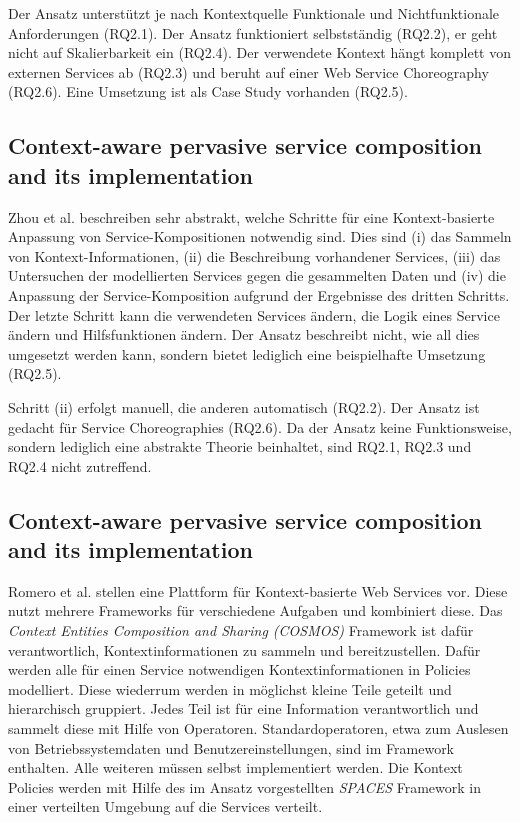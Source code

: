 \documentclass[conference,compsoc]{IEEEtran}
\begin{document}
Der Ansatz unterstützt je nach Kontextquelle Funktionale und Nichtfunktionale Anforderungen (RQ2.1). Der Ansatz funktioniert selbstständig (RQ2.2), er geht nicht auf Skalierbarkeit ein (RQ2.4). Der verwendete Kontext hängt komplett von externen Services ab (RQ2.3) und beruht auf einer Web Service Choreography (RQ2.6). Eine Umsetzung ist als Case Study vorhanden (RQ2.5).

\subsection{Context-aware pervasive service composition and its implementation}
Zhou et al. \cite{ZGP11} beschreiben sehr abstrakt, welche Schritte für eine Kontext-basierte Anpassung von Service-Kompositionen notwendig sind. Dies sind (i) das Sammeln von Kontext-Informationen, (ii) die Beschreibung vorhandener Services, (iii) das Untersuchen der modellierten Services gegen die gesammelten Daten und (iv) die Anpassung der Service-Komposition aufgrund der Ergebnisse des dritten Schritts. Der letzte Schritt kann die verwendeten Services ändern, die Logik eines Service ändern und Hilfsfunktionen ändern. Der Ansatz beschreibt nicht, wie all dies umgesetzt werden kann, sondern bietet lediglich eine beispielhafte Umsetzung (RQ2.5).

Schritt (ii) erfolgt manuell, die anderen automatisch (RQ2.2). Der Ansatz ist gedacht für Service Choreographies (RQ2.6). Da der Ansatz keine Funktionsweise, sondern lediglich eine abstrakte Theorie beinhaltet, sind RQ2.1, RQ2.3 und RQ2.4 nicht zutreffend.

\subsection{Context-aware pervasive service composition and its implementation}
Romero et al. \cite{RRS10} stellen eine Plattform für Kontext-basierte Web Services vor. Diese nutzt mehrere Frameworks für verschiedene Aufgaben und kombiniert diese. Das \textit{Context Entities Composition and Sharing (COSMOS)} Framework \cite{RCS08} ist dafür verantwortlich, Kontextinformationen zu sammeln und bereitzustellen. Dafür werden alle für einen Service notwendigen Kontextinformationen in Policies modelliert. Diese wiederrum werden in möglichst kleine Teile geteilt und hierarchisch gruppiert. Jedes Teil ist für eine Information verantwortlich und sammelt diese mit Hilfe von Operatoren. Standardoperatoren, etwa zum Auslesen von Betriebssystemdaten und Benutzereinstellungen, sind im Framework enthalten. Alle weiteren müssen selbst implementiert werden. Die Kontext Policies werden mit Hilfe des im Ansatz vorgestellten \textit{SPACES} Framework \cite{SMF09} in einer verteilten Umgebung auf die Services verteilt.
\end{document}
